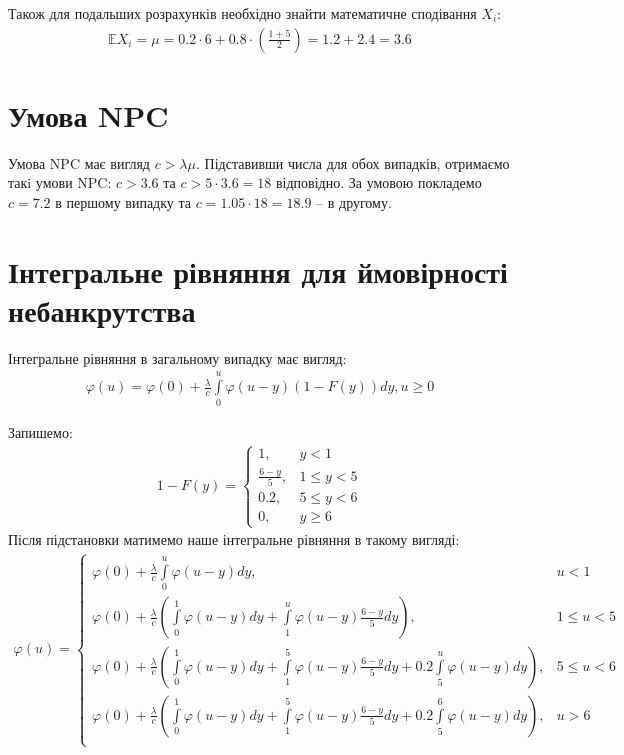 \documentclass{article}
\newcommand{\E}{\mathbb{E}}
\newcommand{\intl}{\int\limits}
\begin{document}
    Також для подальших розрахунків необхідно знайти математичне сподівання $X_i$:
    \begin{gather}
        \E X_i = \mu = 0.2\cdot6 + 0.8\cdot(\frac{1 + 5}{2}) = 1.2 + 2.4 = 3.6
    \end{gather}
    \section{Умова NPC}

    Умова NPC має вигляд $c > \lambda \mu$. Підставивши числа для обох випадків, отримаємо 
    такi умови NPC: $c > 3.6$ та $c > 5 \cdot 3.6 = 18$ відповідно. За умовою покладемо 
    $c = 7.2$ в першому випадку та $c = 1.05 \cdot 18 = 18.9$ -- в другому.

    \section{Інтегральне рівняння для ймовірності небанкрутства}
    Інтегральне рівняння в загальному випадку має вигляд:
    \begin{gather}\label{int_eq}
        \varphi(u) = \varphi(0) + \frac{\lambda}{c} \intl_0^u {\varphi(u-y) (1 - F(y)) dy}, u \geq 0
    \end{gather}
    
    Запишемо: 
    \begin{gather}
        1 - F(y) = 
        \begin{cases}
            1, & y < 1 \\
            \frac{6 - y}{5}, & 1 \leq y < 5 \\
            0.2, & 5 \leq y < 6 \\
            0, & y \geq 6
        \end{cases}
    \end{gather}
    Після підстановки матимемо наше інтегральне рівняння в такому вигляді:
    \begin{gather}
        \varphi(u) = 
        \begin{cases}
            \varphi(0) + \frac{\lambda}{c} \intl_0^u \varphi(u-y)dy, & u < 1 \\
            \varphi(0) + \frac{\lambda}{c} (\intl_0^1 \varphi(u-y)dy + 
            \intl_1^u \varphi(u-y)\frac{6-y}{5}dy), & 1 \leq u < 5 \\
            \varphi(0) + \frac{\lambda}{c} (\intl_0^1 \varphi(u-y)dy + 
            \intl_1^5 \varphi(u-y)\frac{6-y}{5}dy + 
            0.2\intl_5^u \varphi(u-y)dy), & 5 \leq u < 6 \\
            \varphi(0) + \frac{\lambda}{c} (\intl_0^1 \varphi(u-y)dy + 
            \intl_1^5 \varphi(u-y)\frac{6-y}{5}dy + 
            0.2\intl_5^6 \varphi(u-y)dy), & u > 6 \\
        \end{cases}
    \end{gather}
\end{document}
